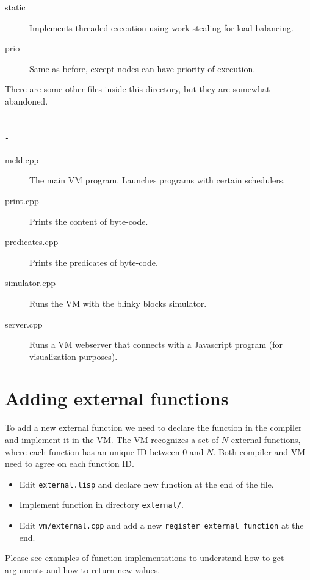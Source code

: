 \documentclass[11pt]{article}
\begin{document}
\begin{description}
   \item[static] Implements threaded execution using work stealing for load balancing.
   \item[prio] Same as before, except nodes can have priority of execution.
\end{description}

There are some other files inside this directory, but they are somewhat abandoned.

\subsection{.}

\begin{description}
   \item[meld.cpp] The main VM program. Launches programs with certain schedulers.
   \item[print.cpp] Prints the content of byte-code.
   \item[predicates.cpp] Prints the predicates of byte-code.
   \item[simulator.cpp] Runs the VM with the blinky blocks simulator.
   \item[server.cpp] Runs a VM webserver that connects with a Javascript program (for visualization purposes).
\end{description}

\section{Adding external functions}

To add a new external function we need to declare the function in the compiler and implement it in the VM. The VM recognizes a set of $N$ external functions, where each function has an unique ID between $0$ and $N$. Both compiler and VM need to agree on each function ID.

\begin{itemize}
   \item Edit \texttt{external.lisp} and declare new function at the end of the file.
   \item Implement function in directory \texttt{external/}.
   \item Edit \texttt{vm/external.cpp} and add a new \texttt{register\_external\_function} at the end.
\end{itemize}

Please see examples of function implementations to understand how to get arguments and how to return new values.
\end{document}
